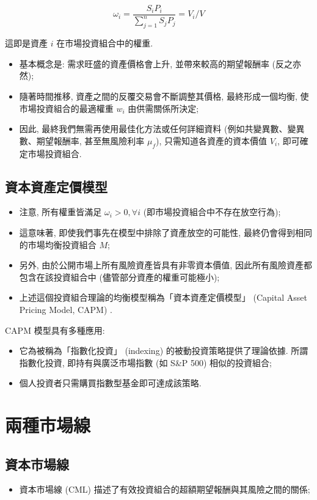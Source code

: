 \documentclass[letterpaper]{article}
\begin{document}
		
		$$
		\omega_{i}=\frac{S_{i} P_{i}}{\sum_{j=1}^{n} S_{j} P_{j}}=V_{i} / V
		$$
		
		這即是資產 $i$ 在市場投資組合中的權重. 
		
		\begin{itemize}
			\item 基本概念是: 需求旺盛的資產價格會上升, 並帶來較高的期望報酬率 (反之亦然); 
			\item 隨著時間推移, 資產之間的反覆交易會不斷調整其價格, 最終形成一個均衡, 使市場投資組合的最適權重 $w_{i}$ 由供需關係所決定; 
			\item 因此, 最終我們無需再使用最佳化方法或任何詳細資料 (例如共變異數、變異數、期望報酬率, 甚至無風險利率 $\mu_{f}$), 只需知道各資產的資本價值 $V_{i}$, 即可確定市場投資組合. 
		\end{itemize}
		
		
		\subsection{資本資產定價模型}
		\begin{itemize}
			\item 注意, 所有權重皆滿足 $\omega_{i} > 0, \forall i$ (即市場投資組合中不存在放空行為); 
			\item 這意味著, 即使我們事先在模型中排除了資產放空的可能性, 最終仍會得到相同的市場均衡投資組合 $M$; 
			\item 另外, 由於公開市場上所有風險資產皆具有非零資本價值, 因此所有風險資產都包含在該投資組合中 (儘管部分資產的權重可能極小); 
			\item 上述這個投資組合理論的均衡模型稱為「資本資產定價模型」 (Capital Asset Pricing Model, CAPM) . 
		\end{itemize}
		
		CAPM 模型具有多種應用: 
		
		\begin{itemize}
			\item 它為被稱為「指數化投資」 (indexing) 的被動投資策略提供了理論依據. 所謂指數化投資, 即持有與廣泛市場指數 (如 S\&P 500) 相似的投資組合; 
			\item 個人投資者只需購買指數型基金即可達成該策略. 
		\end{itemize}
		
		\section{兩種市場線}
		\subsection{資本市場線}
		\begin{itemize}
			\item 資本市場線 (CML) 描述了有效投資組合的超額期望報酬與其風險之間的關係; 
		\end{itemize}
		
\end{document}
